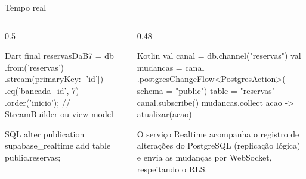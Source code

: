 \documentclass[aspectratio=169,10pt]{beamer}
\begin{document}
\begin{frame}[fragile]{Tempo real}
  \begin{columns}[T]
    \begin{column}{0.5\textwidth}
\begin{codigo}[title=Dart: lista sempre atualizada]{Dart}
final reservasDaB7 = db
    .from('reservas')
    .stream(primaryKey: ['id'])
    .eq('bancada_id', 7)
    .order('inicio');
// StreamBuilder ou view model
\end{codigo}
\begin{codigo}[title=Habilitar a tabela no Realtime]{SQL}
alter publication supabase_realtime
  add table public.reservas;
\end{codigo}
    \end{column}
    \begin{column}{0.48\textwidth}
\begin{codigo}[title=Kotlin: mudanças como Flow]{Kotlin}
val canal = db.channel("reservas")
val mudancas = canal
  .postgresChangeFlow<PostgresAction>(
      schema = "public") {
    table = "reservas"
  }
canal.subscribe()
mudancas.collect { acao -> atualizar(acao) }
\end{codigo}
      \begin{pordentro}
        O serviço Realtime acompanha o registro de alterações do PostgreSQL (replicação lógica) e envia as mudanças por WebSocket, respeitando o RLS.
      \end{pordentro}
    \end{column}
  \end{columns}
\end{frame}
\end{document}
